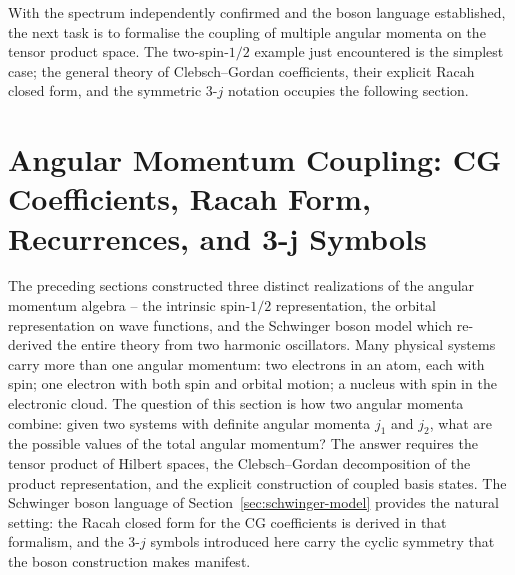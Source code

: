 With the spectrum independently confirmed and the boson language established, the next task is to formalise the coupling of multiple angular momenta on the tensor product space. The two-spin-$1/2$ example just encountered is the simplest case; the general theory of Clebsch--Gordan coefficients, their explicit Racah closed form, and the symmetric 3-$j$ notation occupies the following section.

\section{Angular Momentum Coupling: CG Coefficients, Racah Form, Recurrences, and 3-j Symbols}
\label{sec:angular-momentum-coupling}

The preceding sections constructed three distinct realizations of the angular momentum algebra -- the intrinsic spin-$1/2$ representation, the orbital representation on wave functions, and the Schwinger boson model which re-derived the entire theory from two harmonic oscillators. Many physical systems carry more than one angular momentum: two electrons in an atom, each with spin; one electron with both spin and orbital motion; a nucleus with spin in the electronic cloud. The question of this section is how two angular momenta combine: given two systems with definite angular momenta $j_1$ and $j_2$, what are the possible values of the total angular momentum? The answer requires the tensor product of Hilbert spaces, the Clebsch--Gordan decomposition of the product representation, and the explicit construction of coupled basis states. The Schwinger boson language of Section~\ref{sec:schwinger-model} provides the natural setting: the Racah closed form for the CG coefficients is derived in that formalism, and the 3-$j$ symbols introduced here carry the cyclic symmetry that the boson construction makes manifest.

